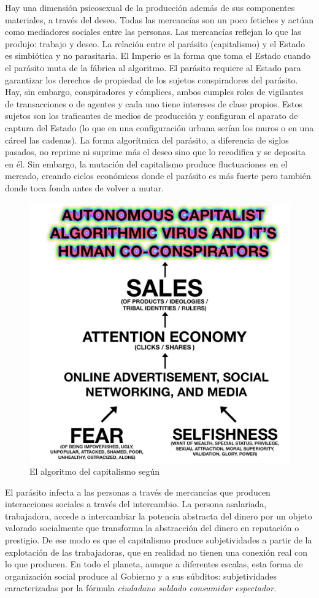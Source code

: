 Hay una dimensión psicosexual de la producción además de sus componentes materiales, a través del deseo. Todas las mercancías son un poco fetiches y actúan como mediadores sociales entre las personas. Las mercancías reflejan lo que las produjo: trabajo y deseo. La relación entre el parásito (capitalismo) y el Estado es simbiótica y no parasitaria. El Imperio es la forma que toma el Estado cuando el parásito muta de la fábrica al algoritmo. El parásito requiere al Estado para garantizar los derechos de propiedad de los sujetos conspiradores del parásito. Hay, sin embargo, conspiradores y cómplices, ambos cumples roles de vigilantes de transacciones o de agentes y cada uno tiene intereses de clase propios. Estos sujetos son los traficantes de medios de producción y configuran el aparato de captura del Estado (lo que en una configuración urbana serían los muros o en una cárcel las cadenas). La forma algorítmica del parásito, a diferencia de siglos pasados, no reprime ni suprime más el deseo sino que lo recodifica y se deposita en él. Sin embargo, la mutación del capitalismo produce fluctuaciones en el mercado, creando ciclos económicos donde el parásito es más fuerte pero también donde toca fonda antes de volver a mutar.

\begin{figure}[htb]
  \centering
  \includegraphics[width=0.7\linewidth]{images/algorithm-capitalism.png}
  \caption{El algoritmo del capitalismo según \autocite{AltWokeCompanion2017}}
  \label{fig:algocap}
\end{figure}

El parásito infecta a las personas a través de mercancías que producen interacciones sociales a través del intercambio. La persona asalariada, trabajadora, accede a intercambiar la potencia abstracta del dinero por un objeto valorado socialmente que transforma la abstracción del dinero en reputación o prestigio. De ese modo es que el capitalismo produce subjetividades a partir de la explotación de las trabajadoras, que en realidad no tienen una conexión real con lo que producen. En todo el planeta, aunque a diferentes escalas, esta forma de organización social produce al Gobierno y a sus súbditos: subjetividades caracterizadas por la fórmula \emph{ciudadano soldado consumidor espectador}.

